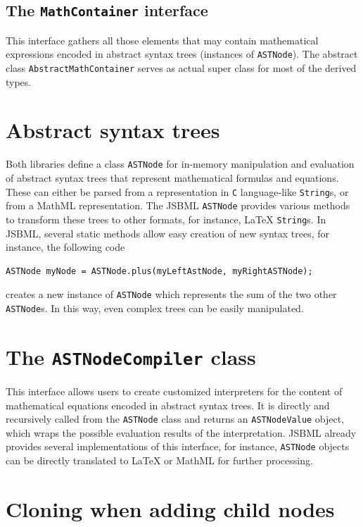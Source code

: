 \documentclass[
  BCOR12mm,
  letterpaper,
  11pt,
  headsepline,
  pointlessnumbers,
  tablecaptionabove,
  headinclude,
  appendixprefix,
  idxtotoc,
  bibtotoc,
  twoside,
  titlepage
]{scrartcl}
\begin{document}
\subsection{The \texttt{MathContainer} interface}

This interface gathers all those elements that may contain mathematical
expressions encoded in abstract syntax trees (instances of \verb!ASTNode!).
The abstract class \verb!AbstractMathContainer! serves as actual super class
for most of the derived types.



\section{Abstract syntax trees}

Both libraries define a class \verb!ASTNode! for in-memory manipulation and
evaluation of abstract syntax trees that represent mathematical formulas and
equations. These can either be parsed from a representation in \verb!C!
language-like \verb!String!s, or from a MathML representation. The JSBML
\verb!ASTNode! provides various methods to transform these trees to other
formats, for instance, \LaTeX{} \verb!String!s. In JSBML, several static methods
allow easy creation of new syntax trees, for instance, the following code
\begin{verbatim}
ASTNode myNode = ASTNode.plus(myLeftAstNode, myRightASTNode);
\end{verbatim}
creates a new instance of \verb!ASTNode! which represents the sum of the two
other \verb!ASTNode!s. In this way, even complex trees can be easily
manipulated.

\section{The \texttt{ASTNodeCompiler} class}

This interface allows users to create customized interpreters for the
content of mathematical equations encoded in abstract syntax trees. It
is directly and recursively called from the \verb!ASTNode! class and returns
an \verb!ASTNodeValue! object, which wraps the possible evaluation results of
the interpretation. JSBML already provides several implementations of
this interface, for instance, \verb!ASTNode! objects can be directly translated
to LaTeX or MathML for further processing.

\section{Cloning when adding child nodes}
\end{document}
